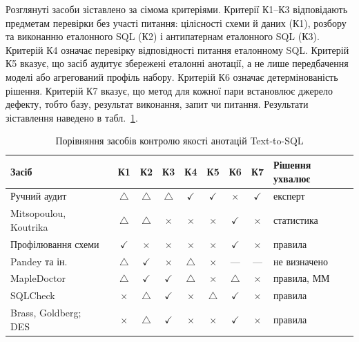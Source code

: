 \documentclass[a4paper,14pt,oneside]{extreport}
\begin{document}
Розглянуті засоби зіставлено за сімома критеріями. Критерії К1--К3 відповідають предметам перевірки без участі питання: цілісності схеми й даних (К1), розбору та виконанню еталонного SQL (К2) і антипатернам еталонного SQL (К3). Критерій К4 означає перевірку відповідності питання еталонному SQL. Критерій К5 вказує, що засіб аудитує збережені еталонні анотації, а не лише передбачення моделі або агрегований профіль набору. Критерій К6 означає детермінованість рішення. Критерій К7 вказує, що метод для кожної пари встановлює джерело дефекту, тобто базу, результат виконання, запит чи питання. Результати зіставлення наведено в табл.~\ref{tab:audit-means}.

\begin{table}[htbp]
  \caption{Порівняння засобів контролю якості анотацій Text-to-SQL}
  \label{tab:audit-means}
  \small
  \renewcommand{\arraystretch}{1.15}
  \setlength{\tabcolsep}{3pt}
  \begin{tabularx}{\textwidth}{@{}>{\raggedright\arraybackslash}X ccccccc >{\raggedright\arraybackslash}p{3.0cm}@{}}
    \toprule
    Засіб & К1 & К2 & К3 & К4 & К5 & К6 & К7 & Рішення ухвалює \\
    \midrule
    Ручний аудит~\cite{pourreza2023evaluating,wretblad2024noise} &
    $\triangle$ & $\triangle$ & $\triangle$ & $\checkmark$ & $\checkmark$ & $\times$ & $\checkmark$ & експерт \\
    Mitsopoulou, Koutrika~\cite{mitsopoulou2025analysis} &
    $\triangle$ & $\triangle$ & $\times$ & $\times$ & $\times$ & $\checkmark$ & $\times$ & статистика \\
    \midrule
    Профілювання схеми~\cite{abedjan2015profiling,memari2015sql,schemacrawler} &
    $\checkmark$ & $\times$ & $\times$ & $\times$ & $\times$ & $\checkmark$ & $\times$ & правила \\
    Pandey та ін.~\cite{pandey2024validation} &
    $\triangle$ & $\checkmark$ & $\times$ & $\triangle$ & $\times$ & --- & --- & не визначено \\
    MapleDoctor~\cite{shen2026mapledoctor} &
    $\triangle$ & $\checkmark$ & $\checkmark$ & $\triangle$ & $\times$ & $\triangle$ & $\times$ & правила, ММ \\
    SQLCheck~\cite{dintyala2020sqlcheck} &
    $\times$ & $\triangle$ & $\checkmark$ & $\times$ & $\triangle$ & $\checkmark$ & $\times$ & правила \\
    Brass, Goldberg; DES~\cite{brass2006semantic,saenz2019clp} &
    $\times$ & $\triangle$ & $\checkmark$ & $\times$ & $\times$ & $\checkmark$ & $\times$ & правила \\

\end{tabularx}
\end{table}
\end{document}
